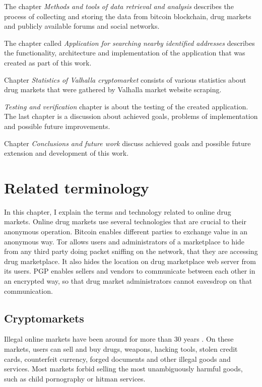 \documentclass[
  digital, %
  table,   %
  lof,     %
  lot,     %
  oneside
]{fithesis3}
\begin{document}
The chapter \emph{Methods and tools of data retrieval and analysis} describes the process of collecting
and storing the data from bitcoin blockchain, drug markets and publicly available forums and social networks. 

The chapter called 
\emph{Application for searching nearby identified addresses}
describes the functionality, architecture and implementation of the application that was created as part of this work.

Chapter \emph{Statistics of Valhalla cryptomarket} consists of various statistics about
drug markets that were gathered by Valhalla market website scraping.

\emph{Testing and verification} chapter is about the testing of the created application.
The last chapter is a discussion about achieved goals, problems of implementation and possible future improvements.

Chapter \emph{Conclusions and future work} discuss achieved goals and possible future extension and development
of this work.


\chapter{Related terminology}

In this chapter, I explain the terms and technology related to online drug markets.
Online drug markets use several technologies that are crucial to their anonymous operation.
Bitcoin enables different parties to exchange value in an anonymous way.
Tor allows users and administrators of a marketplace to hide from any third party doing packet sniffing on the network,
that they are accessing drug marketplace. It also hides the location on drug marketplace web server from its users.
PGP enables sellers and vendors to communicate between each other in an encrypted way,
so that drug market administrators cannot eavesdrop on that communication.

\section{Cryptomarkets}

Illegal online markets have been around for more than 30 years \parencite{motoyama2011analysis}.
On these markets, users can sell and buy drugs, weapons, hacking tools, stolen credit cards,
counterfeit currency, forged documents and other illegal goods and services.
Most markets forbid selling the most unambiguously harmful goods, such as child pornography or hitman services.
\end{document}
